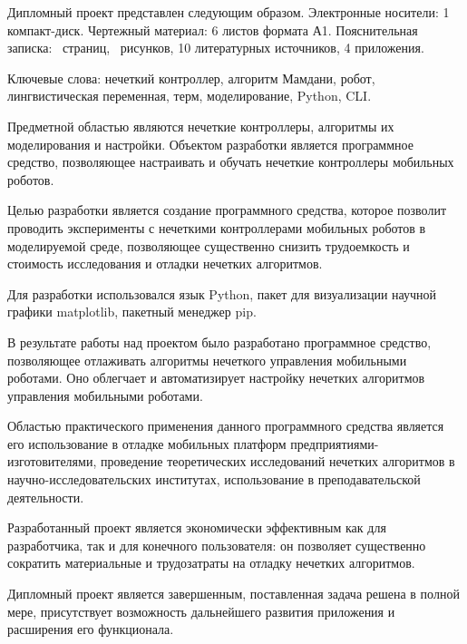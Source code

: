\thispagestyle{empty}

Дипломный проект представлен следующим образом. Электронные
носители: 1 компакт-диск. Чертежный материал: 6 листов формата А1.
Пояснительная записка: \pageref*{LastPage}~страниц, \totfig{}~рисунков, 10 литературных
источников, 4 приложения.

Ключевые слова: нечеткий контроллер, алгоритм Мамдани, робот,
лингвистическая переменная, терм, моделирование, Python, CLI.

Предметной областью являются нечеткие контроллеры, алгоритмы их
моделирования и настройки. Объектом разработки является программное
средство, позволяющее настраивать и обучать нечеткие контроллеры
мобильных роботов.

Целью разработки является создание программного средства, которое
позволит проводить эксперименты с нечеткими контроллерами мобильных
роботов в моделируемой среде, позволяющее существенно снизить
трудоемкость и стоимость исследования и отладки нечетких алгоритмов.

Для разработки использовался язык Python, пакет для визуализации
научной графики matplotlib, пакетный менеджер pip.

В результате работы над проектом было разработано программное
средство, позволяющее отлаживать алгоритмы нечеткого управления
мобильными роботами. Оно облегчает и автоматизирует настройку нечетких
алгоритмов управления мобильными роботами.

Областью практического применения данного программного средства
является его использование в отладке мобильных платформ предприятиями-
изготовителями, проведение теоретических исследований нечетких
алгоритмов в научно-исследовательских институтах, использование в
преподавательской деятельности.

Разработанный проект является экономически эффективным как для
разработчика, так и для конечного пользователя: он позволяет существенно
сократить материальные и трудозатраты на отладку нечетких алгоритмов.

Дипломный проект является завершенным, поставленная задача
решена в полной мере, присутствует возможность дальнейшего развития
приложения и расширения его функционала. 
\clearpage
